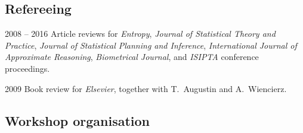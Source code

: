 \documentclass[a4paper]{simplecv}
\begin{document}
\subsection{Refereeing}
\begin{topic}
\item[2008 -- 2016] Article reviews for
\emph{Entropy},
\emph{Journal of Statistical Theory and Practice},
\emph{Journal of Statistical Planning and Inference},
\emph{International Journal of Approximate Reasoning},
\emph{Biometrical Journal}, and
\emph{ISIPTA} conference proceedings.

\item[2009] Book review for \emph{Elsevier}, together with T.\ Augustin and A.\ Wiencierz.
\end{topic}

\subsection{Workshop organisation}

\end{document}
